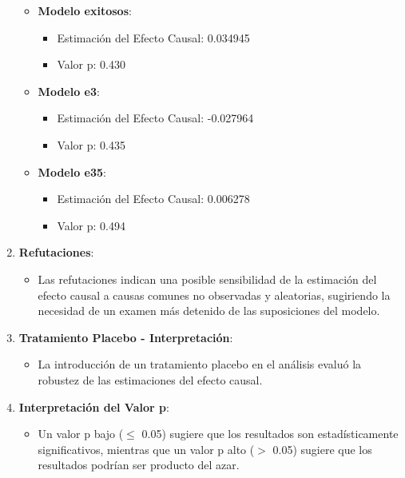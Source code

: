 \begin{enumerate}
\begin{itemize}
\begin{itemize}
                \end{itemize}
            \item \textbf{Modelo exitosos}:
                \begin{itemize}
                    \item Estimación del Efecto Causal: 0.034945
                    \item Valor p: 0.430
                \end{itemize}
            \item \textbf{Modelo e3}:
                \begin{itemize}
                    \item Estimación del Efecto Causal: -0.027964
                    \item Valor p: 0.435
                \end{itemize}
            \item \textbf{Modelo e35}:
                \begin{itemize}
                    \item Estimación del Efecto Causal: 0.006278
                    \item Valor p: 0.494
                \end{itemize}
        \end{itemize}
    
    \item \textbf{Refutaciones}:
        \begin{itemize}
            \item Las refutaciones indican una posible sensibilidad de la estimación del efecto causal a causas comunes no observadas y aleatorias, sugiriendo la necesidad de un examen más detenido de las suposiciones del modelo.
        \end{itemize}
    
    \item \textbf{Tratamiento Placebo - Interpretación}:
        \begin{itemize}
            \item La introducción de un tratamiento placebo en el análisis evaluó la robustez de las estimaciones del efecto causal.
        \end{itemize}
    
    \item \textbf{Interpretación del Valor p}:
        \begin{itemize}
            \item Un valor p bajo ($\leq$ 0.05) sugiere que los resultados son estadísticamente significativos, mientras que un valor p alto ($>$ 0.05) sugiere que los resultados podrían ser producto del azar.
        \end{itemize}
    

\end{enumerate}
